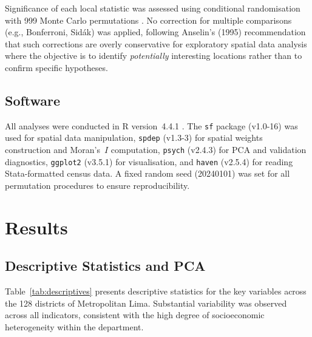 \documentclass[12pt,a4paper,twoside]{article}
\begin{document}
Significance of each local statistic was assessed using conditional randomisation
with 999 Monte Carlo permutations \citep{anselin1995lisa}. No correction for
multiple comparisons (e.g., Bonferroni, Sidák) was applied, following Anselin's
(1995) recommendation that such corrections are overly conservative for exploratory
spatial data analysis where the objective is to identify \textit{potentially}
interesting locations rather than to confirm specific hypotheses.

\subsection{Software}

All analyses were conducted in R version~4.4.1 \citep{rcore2024}. The \texttt{sf}
package (v1.0-16) was used for spatial data manipulation, \texttt{spdep} (v1.3-3)
for spatial weights construction and Moran's~$I$ computation, \texttt{psych}
(v2.4.3) for PCA and validation diagnostics, \texttt{ggplot2} (v3.5.1) for
visualisation, and \texttt{haven} (v2.5.4) for reading Stata-formatted census
data. A fixed random seed (20240101) was set for all permutation procedures to
ensure reproducibility.

\section{Results}

\subsection{Descriptive Statistics and PCA}

Table~\ref{tab:descriptives} presents descriptive statistics for the key variables
across the 128 districts of Metropolitan Lima. Substantial variability was observed
across all indicators, consistent with the high degree of socioeconomic heterogeneity
within the department.
\end{document}
